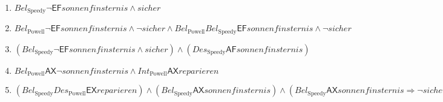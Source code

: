 \newcommand{\bdia}{\mathsf{A}}
\newcommand{\bdie}{\mathsf{E}}
\newcommand{\bdil}[1]{\mathit{#1}}
\newcommand{\bdif}{\mathit{\mathsf{F}}}
\newcommand{\bdix}{\mathit{\mathsf{X}}}

\newcommand{\bdibel}[1]{Bel_\text{#1}}
\newcommand{\bdides}[1]{Des_\text{#1}}
\newcommand{\bdiint}[1]{Int_\text{#1}}

\begin{enumerate}[label=\alph*)]
	\item
	$\bdibel{Speedy}\neg\bdie\bdif\bdil{sonnenfinsternis}\wedge\bdil{sicher}$

	\item
	$\bdibel{Powell}\neg\bdie\bdif\bdil{sonnenfinsternis}\wedge\neg\bdil{sicher}\wedge\bdibel{Powell}\bdibel{Speedy}\bdie\bdif\bdil{sonnenfinsternis}\wedge\neg\bdil{sicher}$	
	
	\item
	$(\bdibel{Speedy}\neg\bdie\bdif\bdil{sonnenfinsternis}\wedge\bdil{sicher})\wedge(\bdides{Speedy}\bdia\bdif\bdil{sonnenfinsternis}) $
	
	\item
	$\bdibel{Powell}\bdia\bdix\neg\bdil{sonnenfinsternis}\wedge\bdiint{Powell}\bdia\bdix\bdil{reparieren}$
%	
%	
%	
	\item
	$(\bdibel{Speedy}\bdides{Powell}\bdie\bdix\bdil{reparieren})\wedge(\bdibel{Speedy}\bdia\bdix\bdil{sonnenfinsternis})\wedge(\bdibel{Speedy}\bdia\bdix\bdil{sonnenfinsternis}\Rightarrow\neg\bdil{sicher})$
%	
\end{enumerate}